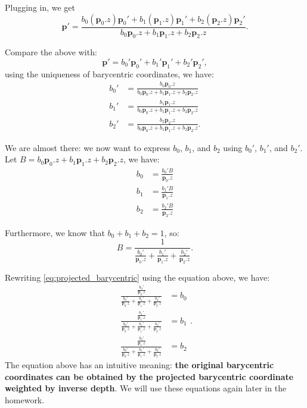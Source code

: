 Plugging in, we get
\begin{equation}
\mathbf{p}' = \frac{b_0 \left(\mathbf{p}_0.z\right) \mathbf{p}_0' + b_1 \left(\mathbf{p}_1.z\right) \mathbf{p}_1' + b_2 \left(\mathbf{p}_2.z\right) \mathbf{p}_2'}{b_0 \mathbf{p}_0.z + b_1 \mathbf{p}_1.z + b_2 \mathbf{p}_2.z}.
\end{equation}

Compare the above with:
\begin{equation}
\mathbf{p}' = b_0' \mathbf{p}_0' + b_1' \mathbf{p}_1' + b_2' \mathbf{p}_2',
\end{equation}
using the uniqueness of barycentric coordinates, we have:
\begin{equation}
\begin{aligned}
b_0' &= \frac{b_0 \mathbf{p}_0.z}{b_0 \mathbf{p}_0.z + b_1 \mathbf{p}_1.z + b_2 \mathbf{p}_2.z} \\
b_1' &= \frac{b_1 \mathbf{p}_1.z}{b_0 \mathbf{p}_0.z + b_1 \mathbf{p}_1.z + b_2 \mathbf{p}_2.z} \\
b_2' &= \frac{b_2 \mathbf{p}_2.z}{b_0 \mathbf{p}_0.z + b_1 \mathbf{p}_1.z + b_2 \mathbf{p}_2.z}.
\end{aligned}
\label{eq:projected_barycentric}
\end{equation}

We are almost there: we now want to express $b_0$, $b_1$, and $b_2$ using $b_0'$, $b_1'$, and $b_2'$. Let $B = b_0 \mathbf{p}_0.z + b_1 \mathbf{p}_1.z + b_2 \mathbf{p}_2.z$, we have:
\begin{equation}
\begin{aligned}
b_0 &= \frac{b_0' B}{\mathbf{p}_0.z} \\
b_1 &= \frac{b_1' B}{\mathbf{p}_1.z} \\
b_2 &= \frac{b_2' B}{\mathbf{p}_2.z}
\end{aligned}
\end{equation}

Furthermore, we know that $b_0 + b_1 + b_2 = 1$, so:
\begin{equation}
B = \frac{1}{\frac{b_0'}{\mathbf{p}_0.z} + \frac{b_1'}{\mathbf{p}_1.z} + \frac{b_2'}{\mathbf{p}_2.z}}.
\end{equation}

Rewriting \cref{eq:projected_barycentric} using the equation above, we have:
\begin{equation}
\begin{aligned}
\frac{\frac{b_0'}{\mathbf{p}_0.z}}{\frac{b_0'}{\mathbf{p}_0.z} + \frac{b_1'}{\mathbf{p}_1.z} + \frac{b_2'}{\mathbf{p}_2.z}} &= b_0 \\
\frac{\frac{b_1'}{\mathbf{p}_1.z}}{\frac{b_0'}{\mathbf{p}_0.z} + \frac{b_1'}{\mathbf{p}_1.z} + \frac{b_2'}{\mathbf{p}_2.z}} &= b_1 \\
\frac{\frac{b_2'}{\mathbf{p}_1.z}}{\frac{b_0'}{\mathbf{p}_0.z} + \frac{b_1'}{\mathbf{p}_1.z} + \frac{b_2'}{\mathbf{p}_2.z}} &= b_2
\end{aligned}.
\label{eq:inverse_depth_weighting}
\end{equation}
The equation above has an intuitive meaning: \textbf{the original barycentric coordinates can be obtained by the projected barycentric coordinate weighted by inverse depth}. We will use these equations again later in the homework.

